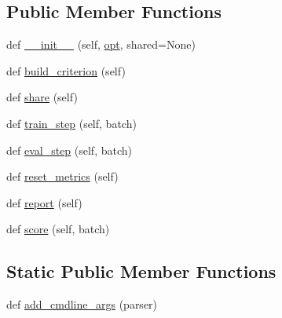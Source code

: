 \subsection*{Public Member Functions}
\begin{DoxyCompactItemize}
\item 
def \hyperlink{classparlai_1_1core_1_1torch__classifier__agent_1_1TorchClassifierAgent_af9f194b4566a43f0840286a39ee0032a}{\+\_\+\+\_\+init\+\_\+\+\_\+} (self, \hyperlink{classparlai_1_1core_1_1torch__agent_1_1TorchAgent_a785bb920cf8c8afc3e9bf6a8b77e335a}{opt}, shared=None)
\item 
def \hyperlink{classparlai_1_1core_1_1torch__classifier__agent_1_1TorchClassifierAgent_adeab756c0b58667aaf417575c23d1dfb}{build\+\_\+criterion} (self)
\item 
def \hyperlink{classparlai_1_1core_1_1torch__classifier__agent_1_1TorchClassifierAgent_a33e56566ee5e81b257b049bd6a3c1cd6}{share} (self)
\item 
def \hyperlink{classparlai_1_1core_1_1torch__classifier__agent_1_1TorchClassifierAgent_a3baacdb005c5f5a6367c45c93d21d398}{train\+\_\+step} (self, batch)
\item 
def \hyperlink{classparlai_1_1core_1_1torch__classifier__agent_1_1TorchClassifierAgent_a5d456df843180fb32ca574dc2a33cc80}{eval\+\_\+step} (self, batch)
\item 
def \hyperlink{classparlai_1_1core_1_1torch__classifier__agent_1_1TorchClassifierAgent_ac96e55ac13019eace0641a7efcf6dc44}{reset\+\_\+metrics} (self)
\item 
def \hyperlink{classparlai_1_1core_1_1torch__classifier__agent_1_1TorchClassifierAgent_acf3aabdf7a98e434614c4da20c599df2}{report} (self)
\item 
def \hyperlink{classparlai_1_1core_1_1torch__classifier__agent_1_1TorchClassifierAgent_a04e97e79ef7e497c0927c10b31e42337}{score} (self, batch)
\end{DoxyCompactItemize}
\subsection*{Static Public Member Functions}
\begin{DoxyCompactItemize}
\item 
def \hyperlink{classparlai_1_1core_1_1torch__classifier__agent_1_1TorchClassifierAgent_ac1dcd540b081131810d3472e91920fa7}{add\+\_\+cmdline\+\_\+args} (parser)
\end{DoxyCompactItemize}
